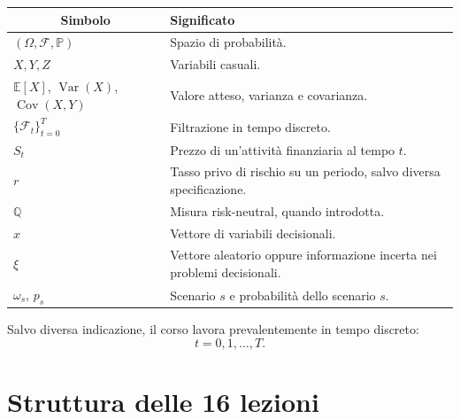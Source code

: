 \documentclass[12pt,a4paper]{article}%
\begin{document}
\begin{center}%
\begin{tabular}
[c]{cp{8.5cm}}\hline
\textbf{Simbolo} & \textbf{Significato}\\\hline
\multicolumn{1}{l}{$\left(  \Omega,\mathcal{F},\mathbb{P}\right)  $} & Spazio
di probabilit\`{a}.\\
\multicolumn{1}{l}{$X,Y,Z$} & Variabili casuali.\\
\multicolumn{1}{l}{$\mathbb{E}[X]$, $\operatorname{Var}(X)$,
$\operatorname{Cov}(X,Y)$} & Valore atteso, varianza e covarianza.\\
\multicolumn{1}{l}{$\{\mathcal{F}_{t}\}_{t=0}^{T}$} & Filtrazione in tempo
discreto.\\
\multicolumn{1}{l}{$S_{t}$} & Prezzo di un'attivit\`{a} finanziaria al tempo
$t$.\\
\multicolumn{1}{l}{$r$} & Tasso privo di rischio su un periodo, salvo diversa
specificazione.\\
\multicolumn{1}{l}{$\mathbb{Q}$} & Misura risk-neutral, quando introdotta.\\
\multicolumn{1}{l}{$x$} & Vettore di variabili decisionali.\\
\multicolumn{1}{l}{$\xi$} & Vettore aleatorio oppure informazione incerta nei
problemi decisionali.\\
\multicolumn{1}{l}{$\omega_{s}$, $p_{s}$} & Scenario $s$ e probabilit\`{a}
dello scenario $s$.\\\hline
\end{tabular}

\end{center}

Salvo diversa indicazione, il corso lavora prevalentemente in tempo discreto:
\[
t=0,1,\ldots,T.
\]


\section{Struttura delle 16 lezioni}
\end{document}
